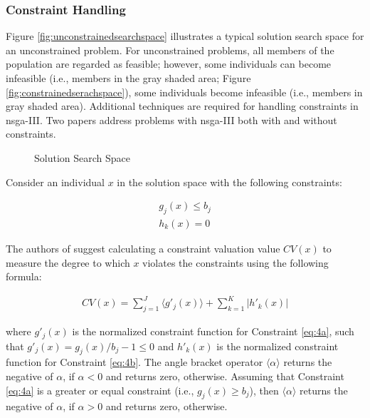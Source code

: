 \subsubsection{Constraint Handling}\label{sec:sub_conshandling}
Figure \ref{fig:unconstrainedsearchspace} illustrates a typical solution search space for an unconstrained problem. For unconstrained problems, all members of the population are regarded as feasible; however, some individuals can become infeasible (i.e., members in the gray shaded area; Figure \ref{fig:constrainedserachspace}), some individuals become infeasible (i.e., members in gray shaded area). Additional techniques are required for handling constraints in \gls{nsga}-III. Two papers address problems with \gls{nsga}-III both with \parencite{Deb2013AnConstraints} and without \parencite{Jain2013AnApproach} constraints. 

\begin{figure}[h!]
\centering
{}\qquad
{}
\caption{Solution Search Space}
\label{fig:constrainedvsunconstrained}
\end{figure}

Consider an individual $x$ in the solution space with the following constraints:

\begin{align}
    \tag{constraint 1 }g_j(x) \leq b_j \label{eq:4a}\\
    \tag{constraint 2}h_k(x) = 0 \label{eq:4b}
\end{align}

The authors of \parencite{Jain2013AnApproach} suggest calculating a constraint valuation value $CV(x)$ to measure the degree to which $x$ violates the constraints using the following formula:

\begin{align}
    \tag{1}CV(x) = \sum_{j=1}^J \langle g'_j(x)\rangle + \sum_{k=1}^K \lvert h'_k(x)\rvert \label{eq:4c}
\end{align}

where $g'_j(x)$ is the normalized constraint function for Constraint \ref{eq:4a}, such that $g'_j(x) = g_j(x) / b_j  - 1 \leq 0$ and $h'_k(x)$ is the normalized constraint function for Constraint \ref{eq:4b}. The angle bracket operator $\langle \alpha \rangle$ returns the negative of $\alpha$, if $\alpha < 0$ and returns zero, otherwise. Assuming that Constraint \ref{eq:4a} is a greater or equal constraint (i.e., $g_j(x) \geq b_j$), then $\langle \alpha \rangle$ returns the negative of $\alpha$, if $\alpha > 0$ and returns zero, otherwise.

